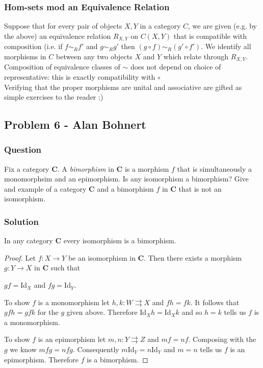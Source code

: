 \documentclass{article}
\begin{document}
\subsubsection{Hom-sets mod an Equivalence Relation}
Suppose that for every pair of objects $X,Y$ in a category $C$, we are given (e.g. by the above) an equivalence relation $R_{X,Y}$ on $C(X,Y)$ that is compatible with composition (i.e. if $f\sim_Rf'$ and $g\sim_Rg'$ then $(g\circ{}f)\sim_R(g'\circ{}f')$.  We identify all morphisms in $C$ between any two objects $X$ and $Y$ which relate through $R_{X,Y}$.  Composition of equivalence classes of $\sim{}$ does not depend on choice of representative: this is exactly compatibility with $\circ{}$\\Verifying that the proper morphisms are unital and associative are gifted as simple exercises to the reader ;)



\subsection{Problem 6 - Alan Bohnert}
\subsubsection{Question}
Fix a category \textbf{C}. 
A \textit{bimorphism} in \textbf{C} is a morphism $f$ that is simultaneously a monomorphsim and an epimorphism. Is any isomorphism a bimorphism? 
Give and example of a category \textbf{C} and a bimorphism $f$ in \textbf{C} that is not an isomorphism.

\subsubsection{Solution}
In any category \textbf{C} every isomorphism is a bimorphism.

\begin{proof}
    Let $f:X\xrightarrow{}Y$ be an isomorphism in \textbf{C}. 
    Then there exists a morphism $g:Y\xrightarrow{}X$ in \textbf{C} such that 
    \begin{center}
        $gf=$Id$_X$ and $fg=$Id$_Y$.
    \end{center}
    
    To show $f$ is a monomorphism let $h,k:W \rightrightarrows X$ and $fh=fk$.
    It follows that $gfh=gfk$ for the $g$ given above.
    Therefore Id$_X h=$Id$_X k$ and so $h=k$ tells us $f$ is a monomorphism.
    
    To show $f$ is an epimorphism let $m,n:Y \rightrightarrows Z$ and $mf=nf$.
    Composing with the $g$ we know $mfg=nfg$.
    Consequently $m$Id$_Y=n$Id$_Y$ and $m=n$ tells us $f$ is an epimorphism.
    Therefore $f$ is a bimorphism.
\end{proof}
\end{document}
